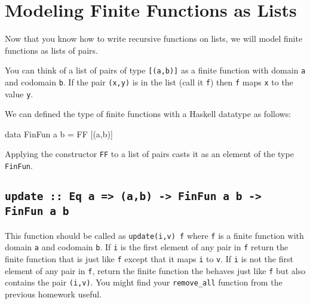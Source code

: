 \documentclass[11pt]{article}
\begin{document}

\section{Modeling Finite Functions as Lists}

Now that you know how to write recursive functions on lists, we will
model finite functions as lists of pairs.


You can think of a list of pairs of type {\tt{[(a,b)]}} as a finite
function with domain {\tt{a}} and codomain {\tt{b}}.  If the pair
{\tt{(x,y)}} is in the list (call it {\tt{f}}) then {\tt{f}} maps
{\tt{x}} to the value {\tt{y}}.

We can defined the type of finite functions with a Haskell datatype as
follows:

\begin{program*}
\>  data FinFun a b = FF [(a,b)] \\
\end{program*}

Applying the constructor {\tt{FF}} to a list of pairs casts it
as an element of the type {\tt{FinFun}}.



\subsection{{\tt{update :: Eq a => (a,b) -> FinFun a b -> FinFun a b}}}

This function should be called as {\tt{update(i,v) f}} where {\tt{f}} is a
finite function with domain {\tt{a}} and codomain {\tt{b}}.  If {\tt{i}} is the
first element of any pair in {\tt{f}} return the finite function that is just
like {\tt{f}} except that it maps {\tt{i}} to {\tt{v}}.  If {\tt{i}} is not the
first element of any pair in {\tt{f}}, return the finite function the behaves
just like {\tt{f}} but also contains the pair {\tt(i,v)}. You might find your
{\tt{remove\_all}} function from the previous homework useful.
\end{document}
